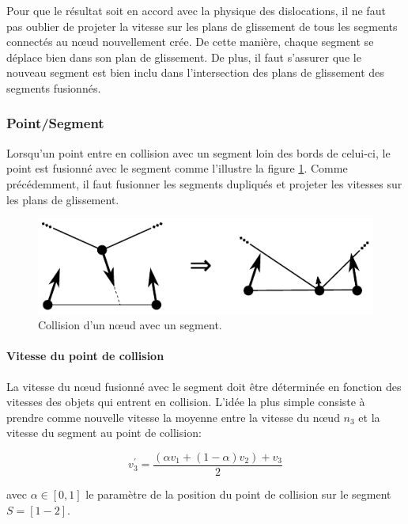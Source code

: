 \documentclass[11pt,class=article,float=false,crop=false]{standalone}
\begin{document}
Pour que le résultat soit en accord avec la physique des dislocations, il ne faut pas oublier de projeter la vitesse sur les plans de glissement de tous les segments connectés au nœud nouvellement crée. De cette manière, chaque segment se déplace bien dans son plan de glissement. De plus, il faut s'assurer que le nouveau segment est bien inclu dans l'intersection des plans de glissement des segments fusionnés.

\subsubsection{Point/Segment}

Lorsqu'un point entre en collision avec un segment loin des bords de celui-ci, le point est fusionné avec le segment comme l'illustre la figure \ref{fig:topo_pointseg}. Comme précédemment, il faut fusionner les segments dupliqués et projeter les vitesses sur les plans de glissement.

\begin{figure}[H]
	\centering
	\includegraphics[height=0.15\textheight]{img/topo_pointseg}
	\caption{Collision d'un nœud avec un segment.}
	\label{fig:topo_pointseg}
\end{figure}

\paragraph{Vitesse du point de collision}
\label{sec:dents_de_scie}

La vitesse du nœud fusionné avec le segment doit être déterminée en fonction des vitesses des objets qui entrent en collision. L'idée la plus simple consiste à prendre comme nouvelle vitesse la moyenne entre la vitesse du nœud $n_3$ et la vitesse du segment au point de collision:

\begin{equation}
	v_3^\prime = \frac{(\alpha v_1 + (1-\alpha)v_2) + v_3 }2
\end{equation}

avec $\alpha \in [0,1]$ le paramètre de la position du point de collision sur le segment $S = [1-2]$.
\end{document}
